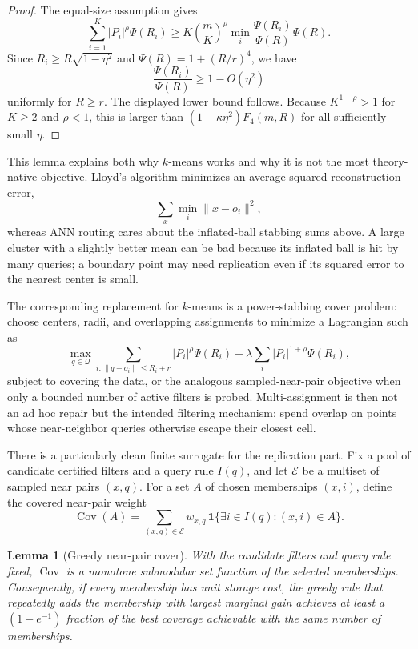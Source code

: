 \documentclass[10pt]{article}
\newtheorem{lemma}[theorem]{Lemma}
\theoremstyle{definition}
\begin{document}
\begin{proof}
   The equal-size assumption gives
   \[
      \sum_{i=1}^K |P_i|^\rho\Psi(R_i)
      \ge
      K\left(\frac mK\right)^\rho
      \min_i\frac{\Psi(R_i)}{\Psi(R)}\Psi(R).
   \]
   Since $R_i\ge R\sqrt{1-\eta^2}$ and
   $\Psi(R)=1+(R/r)^4$, we have
   \[
      \frac{\Psi(R_i)}{\Psi(R)}
      \ge
      1-O(\eta^2)
   \]
   uniformly for $R\ge r$. The displayed lower bound follows. Because
   $K^{1-\rho}>1$ for $K\ge2$ and $\rho<1$, this is larger than
   $(1-\kappa\eta^2)F_4(m,R)$ for all sufficiently small $\eta$.
\end{proof}

This lemma explains both why $k$-means works and why it is not the most
theory-native objective. Lloyd's algorithm minimizes an average squared
reconstruction error,
\[
   \sum_x \min_i\|x-o_i\|^2,
\]
whereas ANN routing cares about the inflated-ball stabbing sums above. A large
cluster with a slightly better mean can be bad because its inflated ball is hit
by many queries; a boundary point may need replication even if its squared
error to the nearest center is small.

The corresponding replacement for $k$-means is a power-stabbing cover problem:
choose centers, radii, and overlapping assignments to minimize a Lagrangian such
as
\[
   \max_{q\in\mathcal Q}
   \sum_{i:\|q-o_i\|\le R_i+r}|P_i|^\rho\Psi(R_i)
   +
   \lambda
   \sum_i |P_i|^{1+\rho}\Psi(R_i),
\]
subject to covering the data, or the analogous sampled-near-pair objective when
only a bounded number of active filters is probed. Multi-assignment is then not
an ad hoc repair but the intended filtering mechanism: spend overlap on points
whose near-neighbor queries otherwise escape their closest cell.

There is a particularly clean finite surrogate for the replication part. Fix a
pool of candidate certified filters and a query rule $I(q)$, and let
$\mathcal E$ be a multiset of sampled near pairs $(x,q)$. For a set $A$ of
chosen memberships $(x,i)$, define the covered near-pair weight
\[
   \operatorname{Cov}(A)
   =
   \sum_{(x,q)\in\mathcal E} w_{x,q}\,
   \mathbf 1\{\exists i\in I(q):(x,i)\in A\}.
\]

\begin{lemma}[Greedy near-pair cover]\label{lem:greedy-near-pair-cover}
   With the candidate filters and query rule fixed, $\operatorname{Cov}$ is a
   monotone submodular set function of the selected memberships. Consequently,
   if every membership has unit storage cost, the greedy rule that repeatedly
   adds the membership with largest marginal gain achieves at least a
   $(1-e^{-1})$ fraction of the best coverage achievable with the same number
   of memberships.
\end{lemma}
\end{document}
